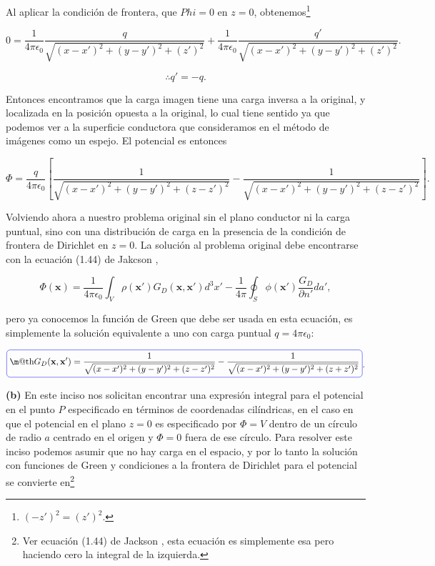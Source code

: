 \documentclass[a4paper,10pt]{article}
\makeatletter
\numberwithin{equation}{section}
\newcommand*{\boxcolor}{blue}
\renewcommand{\boxed}[1]{\textcolor{\boxcolor}{%
\tikz[baseline={([yshift=-1ex]current bounding box.center)}] \node [rectangle, minimum width=1ex,rounded corners,draw] {\normalcolor\m@th$\displaystyle#1$};}}
\makeatother
\begin{document}
Al aplicar la condición de frontera, que $Phi = 0$ en $z = 0$, obtenemos\footnote{
$(-z')^2 = (z')^2$.}

\begin{equation}
  0 = \frac{1}{4\pi\epsilon_0}\frac{q}{\sqrt{(x-x')^2 + (y-y')^2 + (z')^2}} + 
 \frac{1}{4\pi\epsilon_0}\frac{q'}{\sqrt{(x-x')^2 + (y-y')^2 + (z')^2}}.
\end{equation}

\begin{equation}
 \therefore q' = -q.
\end{equation}

Entonces encontramos que la carga imagen tiene una carga inversa a la original, y 
localizada en la posición opuesta a la original, lo cual tiene sentido ya que podemos 
ver a la superficie conductora que consideramos en el método de imágenes como un 
espejo. El potencial es entonces 

\begin{equation*}
  \Phi = \frac{q}{4\pi\epsilon_0}\left[\frac{1}{\sqrt{(x-x')^2 + (y-y')^2 + (z-z')^2}} - 
 \frac{1}{\sqrt{(x-x')^2 + (y-y')^2 + (z-z')^2}}\right].
\end{equation*}

Volviendo ahora a nuestro problema original sin el plano conductor ni la carga 
puntual, sino con una distribución de carga en la presencia de la condición de 
frontera de Dirichlet en $z=0$. La solución al problema original debe encontrarse 
con la ecuación (1.44) de Jakcson \cite{jackson3}, 

\begin{equation}
 \Phi(\mathbf{x}) = \frac{1}{4\pi\epsilon_0} \int_V \rho(\mathbf{x}')G_D(\mathbf{x},
 \mathbf{x}')d^3x' - \frac{1}{4\pi}\oint_S \phi(\mathbf{x}')\frac{G_D}{\partial n'}da',
\end{equation}

pero ya conocemos la función de Green que debe ser usada en esta ecuación, es simplemente 
la solución equivalente a uno con carga puntual $q = 4\pi\epsilon_0$: 

\begin{equation*}
 \boxed{G_D(\mathbf{x},\mathbf{x}') = \frac{1}{\sqrt{(x-x')^2 + (y-y')^2 + (z-z')^2}} - 
 \frac{1}{\sqrt{(x-x')^2 + (y-y')^2 + (z+z')^2}}}.
\end{equation*}

\textbf{(b)} En este inciso nos solicitan encontrar una expresión integral para 
el potencial en el punto $P$ especificado en términos de coordenadas cilíndricas, en 
el caso en que el potencial en el plano $z=0$ es especificado por $\Phi = V$ dentro 
de un círculo de radio $a$ centrado en el origen y $\Phi = 0$ fuera de ese círculo. 
Para resolver este inciso podemos asumir que no hay carga en el espacio, y por lo tanto 
la solución con funciones de Green y condiciones a la frontera de Dirichlet para 
el potencial se convierte en\footnote{Ver ecuación (1.44) de Jackson \cite{jackson3}, 
esta ecuación es simplemente esa pero haciendo cero la integral de la izquierda.}
\end{document}
